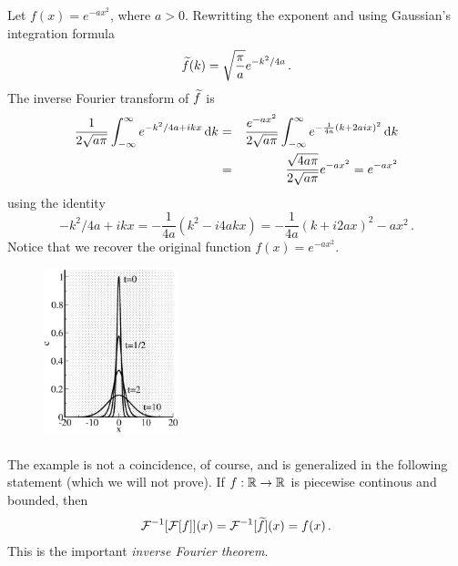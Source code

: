 \begin{example}
	Let $f(x) = e^{-a x^2}$, where $a>0$. Rewritting the exponent and using Gaussian's integration formula
	\begin{equation}
		\label{eq:expx2F}
		\widetilde{f}(k)= \sqrt{\frac{\pi}{a}} e^{-k^2/4 a} \, .
	\end{equation}
	The inverse Fourier transform of $\widetilde{f}$ is
	\begin{eqnarray}
		\frac{1}{2\sqrt{a \pi}} \int_{-\infty}^\infty e^{-k^2/4a + ikx} \, \mathrm{d} k &=&
			\frac{e^{-ax^2}}{2\sqrt{a \pi}} \int_{-\infty}^\infty e^{-\frac{1}{4a}\left(k + 2aix\right)^2} \, \mathrm{d} k \nonumber \\
			&=& \frac{\sqrt{4 a \pi}}{2\sqrt{a\pi}} e^{-ax^2} = e^{-ax^2} 
	\end{eqnarray}
	using the identity 
	\begin{equation}
		-k^2/4a + ikx = -\frac{1}{4a}\left(k^2 - i4akx\right) =   -\frac{1}{4a}\left(k + i2ax\right)^2 - ax^2 \, .
	\end{equation}
	Notice that we recover the original function $f(x) = e^{-ax^2}$. 
\end{example}	

\begin{figure}
	\centering
	\includegraphics[width=0.35\textwidth]{figs/diffunbounded.eps}
\end{figure}
\paragraph{}
\vspace*{-\parskip}
The example is not a coincidence, of course, and is generalized in the following statement (which we will not prove).
If $f: \mathbb{R} \rightarrow \mathbb{R}$ is piecewise continous and bounded, then
\begin{eqnarray}
	\mathcal{F}^{-1}[\mathcal{F}[f]](x) = \mathcal{F}^{-1}[\widetilde{f}](x) = f(x) \, .
\end{eqnarray}
This is the important \emph{inverse Fourier theorem}. 

